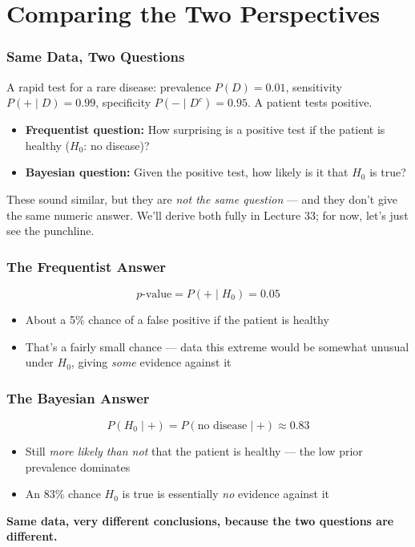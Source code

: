 \documentclass[slidestop,compress,mathserif]{beamer}
\begin{document}

\section{Comparing the Two Perspectives}

\begin{frame}
    \frametitle{Same Data, Two Questions}
    A rapid test for a rare disease: prevalence $P(D)=0.01$, sensitivity $P(+\mid D) = 0.99$, specificity $P(-\mid D^c)=0.95$. A patient tests positive.
    \pause

    \medskip
    \begin{itemize}
        \item \textbf{Frequentist question:} How surprising is a positive test if the patient is healthy ($H_0$: no disease)?
        \item \textbf{Bayesian question:} Given the positive test, how likely is it that $H_0$ is true?
    \end{itemize}
    \pause

    \medskip
    These sound similar, but they are \emph{not the same question} --- and they don't give the same numeric answer. We'll derive both fully in Lecture 33; for now, let's just see the punchline.
\end{frame}

\begin{frame}
    \frametitle{The Frequentist Answer}
    \[
    p\text{-value} = P(+ \mid H_0) = 0.05
    \]
    \pause
    \begin{itemize}
        \item About a 5\% chance of a false positive if the patient is healthy
        \item That's a fairly small chance --- data this extreme would be somewhat unusual under $H_0$, giving \emph{some} evidence against it
    \end{itemize}
\end{frame}

\begin{frame}
    \frametitle{The Bayesian Answer}
    \[
    P(H_0 \mid +) = P(\text{no disease}\mid +) \approx 0.83
    \]
    \pause
    \begin{itemize}
        \item Still \emph{more likely than not} that the patient is healthy --- the low prior prevalence dominates
        \item An 83\% chance $H_0$ is true is essentially \emph{no} evidence against it
    \end{itemize}
    \pause

    \medskip
    \textbf{Same data, very different conclusions, because the two questions are different.}
\end{frame}
\end{document}
